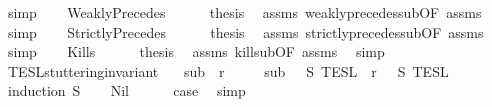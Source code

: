 \begin{isabellebody}
\ simp\isanewline
{}\isamarkupfalse%
\isanewline
\ \ \isamarkupfalse%
\ {\isacharparenleft}WeaklyPrecedes{\isacharparenright}\isanewline
\ \ \ \ \isamarkupfalse%
\ {\isacharquery}thesis\ \isamarkupfalse%
\ assms{\isacharparenleft}{}{\isacharparenright}\ weakly{\isacharunderscore}precedes{\isacharunderscore}sub{\isacharbrackleft}OF\ assms{\isacharparenleft}{}{\isacharparenright}{\isacharbrackright}\ \isamarkupfalse%
\ simp\isanewline
{}\isamarkupfalse%
\isanewline
\ \ \isamarkupfalse%
\ {\isacharparenleft}StrictlyPrecedes{\isacharparenright}\isanewline
\ \ \ \ \isamarkupfalse%
\ {\isacharquery}thesis\ \isamarkupfalse%
\ assms{\isacharparenleft}{}{\isacharparenright}\ strictly{\isacharunderscore}precedes{\isacharunderscore}sub{\isacharbrackleft}OF\ assms{\isacharparenleft}{}{\isacharparenright}{\isacharbrackright}\ \isamarkupfalse%
\ simp\isanewline
{}\isamarkupfalse%
\isanewline
\ \ \isamarkupfalse%
\ {\isacharparenleft}Kills{\isacharparenright}\isanewline
\ \ \ \ \isamarkupfalse%
\ {\isacharquery}thesis\ \isamarkupfalse%
\ assms{\isacharparenleft}{}{\isacharparenright}\ kill{\isacharunderscore}sub{\isacharbrackleft}OF\ assms{\isacharparenleft}{}{\isacharparenright}{\isacharbrackright}\ \isamarkupfalse%
\ simp\isanewline
{}\isamarkupfalse%
%
\endisatagproof
{\isafoldproof}%
%
\isadelimproof
\isanewline
%
\endisadelimproof
\isanewline
{}\isamarkupfalse%
\ TESL{\isacharunderscore}stuttering{\isacharunderscore}invariant{\isacharcolon}\isanewline
\ \ \ {\isacartoucheopen}sub\ {\isasymlless}\ r{\isacartoucheclose}\isanewline
\ \ \ \ \ {\isacartoucheopen}sub\ {\isasymin}\ {\isasymlbrakk}{\isasymlbrakk}\ S\ {\isasymrbrakk}{\isasymrbrakk}\isactrlsub T\isactrlsub E\isactrlsub S\isactrlsub L\ {\isasymLongrightarrow}\ r\ {\isasymin}\ {\isasymlbrakk}{\isasymlbrakk}\ S\ {\isasymrbrakk}{\isasymrbrakk}\isactrlsub T\isactrlsub E\isactrlsub S\isactrlsub L{\isacartoucheclose}\isanewline
%
\isadelimproof
%
\endisadelimproof
%
\isatagproof
{}\isamarkupfalse%
\ {\isacharparenleft}induction\ S{\isacharparenright}\isanewline
\ \ \isamarkupfalse%
\ Nil\isanewline
\ \ \ \ \isamarkupfalse%
\ {\isacharquery}case\ \isamarkupfalse%
\ simp\isanewline

\end{isabellebody}
